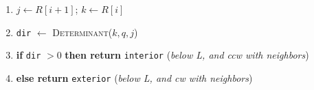 \documentclass [12pt]{article}
\begin{document}
\begin{enumerate}[label=(\alph*)]
\begin{enumerate}[label=\arabic*.]
                \item \hspace{1cm} $j\leftarrow R[i+1]$; $k\leftarrow R[i]$
                
                \item \hspace{1cm} \texttt{dir} $\leftarrow$ \textsc{Determinant}($k, q, j$)
                \item \hspace{1cm} \textbf{if} \texttt{dir} $> 0$ \textbf{then return} \texttt{interior} \hspace{0.25cm} (\emph{below L, and ccw with neighbors})
                \item \hspace{1cm} \textbf{else return} \texttt{exterior} \hspace{2cm} (\emph{below L, and cw with neighbors})
                





\end{enumerate}
\end{enumerate}
\end{document}
